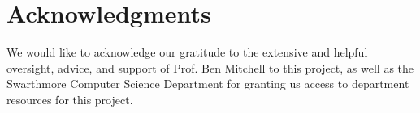 \documentclass{article}
\begin{document}
\section*{Acknowledgments}

We would like to acknowledge our gratitude to the extensive and helpful oversight, advice, and support of Prof. Ben Mitchell
to this project, as well as the Swarthmore Computer Science Department for granting us 
access to department resources for this project. 



\nocite{langley00}



\end{document}
